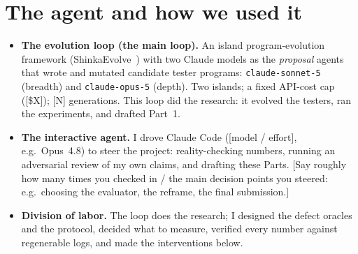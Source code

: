 
\section{The agent and how we used it}
\label{sec:agent}
\begin{itemize}\itemsep2pt
  \item \textbf{The evolution loop (the main loop).} An island program-evolution framework (ShinkaEvolve~\citep{shinkaevolve})
  with two Claude models as the \emph{proposal} agents that wrote and mutated candidate tester programs:
  \texttt{claude-sonnet-5} (breadth) and \texttt{claude-opus-5} (depth). Two islands; a fixed API-cost cap ([\$X]); [N]
  generations. This loop did the research: it evolved the testers, ran the experiments, and drafted Part~1.
  \item \textbf{The interactive agent.} I drove Claude Code ([model / effort], e.g.\ Opus~4.8) to steer the project:
  reality-checking numbers, running an adversarial review of my own claims, and drafting these Parts. [Say roughly how
  many times you checked in / the main decision points you steered: e.g.\ choosing the evaluator, the reframe, the final
  submission.]
  \item \textbf{Division of labor.} The loop does the research; I designed the defect oracles and the protocol, decided
  what to measure, verified every number against regenerable logs, and made the interventions below.
\end{itemize}

